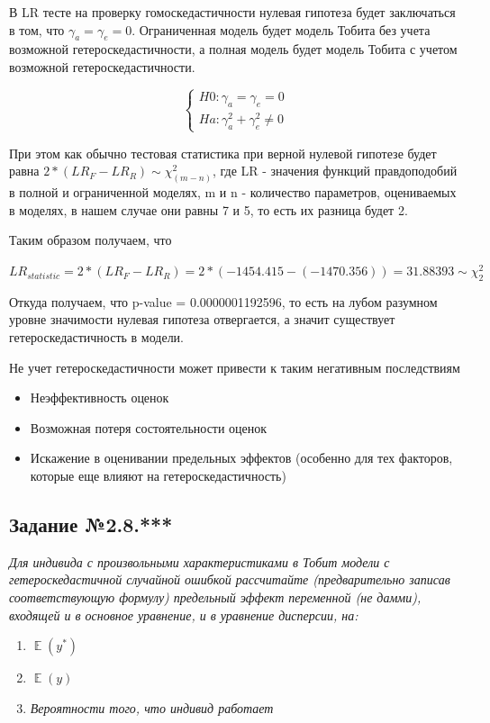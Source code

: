 \documentclass[a4paper,12pt]{article}
\DeclareMathOperator{\EX}{\mathbb{E}}%
\begin{document}
В LR тесте на проверку гомоскедастичности нулевая гипотеза будет заключаться в том, что $\gamma_a= \gamma_e=0$. Ограниченная модель будет модель Тобита без учета возможной гетероскедастичности, а полная модель будет модель Тобита с учетом возможной гетероскедастичности.

\begin{equation*}
	\begin{cases}
		H0: \gamma_a= \gamma_e=0\\
		Ha: \gamma_a^2+ \gamma_e^2 \ne 0
	\end{cases}
\end{equation*}

При этом как обычно тестовая статистика при верной нулевой гипотезе будет равна $2*(LR_{F} - LR_{R}) \sim \chi^2_{(m-n)}$, где LR - значения функций правдоподобий в полной и ограниченной моделях, m и n - количество параметров, оцениваемых в моделях, в нашем случае они равны 7 и 5, то есть их разница будет 2.

Таким образом получаем, что

$
LR_{statistic}=2*(LR_{F} - LR_{R})  = 2*(-1454.415 - (-1470.356)) = 31.88393 \sim\chi^2_2
$

Откуда получаем, что p-value = 0.0000001192596, то есть на лубом разумном  уровне значимости нулевая гипотеза отвергается, а значит существует гетероскедастичность в модели.

Не учет гетероскедастичности может привести к таким негативным последствиям

\begin{itemize}
	\item Неэффективность оценок
	\item Возможная потеря состоятельности оценок
	\item Искажение в оценивании предельных эффектов (особенно для тех факторов, которые еще влияют на гетероскедастичность)
\end{itemize}

\subsection{Задание №2.8.***}
\textit{
Для индивида с произвольными характеристиками в Тобит модели с
гетероскедастичной случайной ошибкой рассчитайте (предварительно записав
соответствующую формулу) предельный эффект переменной (не дамми), входящей и в
основное уравнение, и в уравнение дисперсии, на:}

\begin{enumerate}[label=\Alph*)]
	\item $\EX(y^*)$
	\item $\EX(y)$
	\item \textit{Вероятности того, что индивид работает}
\end{enumerate}
\end{document}
